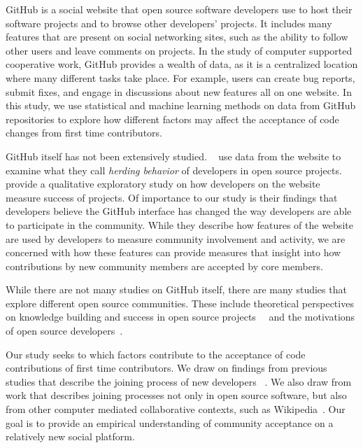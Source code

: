 \documentclass{iitthesis}
\begin{document}
\textpages     %


 \label{sec:github}

GitHub is a social website that open source software developers use to host
their software projects and to browse other developers' projects. It includes
many features that are present on social networking sites, such as the ability
to follow other users and leave comments on projects. In the study of computer
supported cooperative work, GitHub provides a wealth of data, as it is a
centralized location where many different tasks take place. For example, users
can create bug reports, submit fixes, and engage in discussions about new
features all on one website.  In this study, we use statistical and machine
learning methods on data from GitHub repositories to explore how different
factors may affect the acceptance of code changes from first time contributors.

 \label{sec:relatedwork}

GitHub itself has not been extensively studied. ~\cite{choi_herding_2013} use
data from the website to examine what they call \textit{herding behavior} of
developers in open source projects.  ~\cite{mcdonald_performance_2013} provide a
qualitative exploratory study on how developers on the website measure success
of projects. Of importance to our study is their findings that developers
believe the GitHub interface has changed the way developers are able to
participate in the community. While they describe how features of the website
are used by developers to measure community involvement and activity, we are
concerned with how these features can provide measures that insight into how
contributions by new community members are accepted by core members.

While there are not many studies on GitHub itself, there are many studies that
explore different open source communities. These include theoretical
perspectives on knowledge building and success in open source
projects~\cite{hemetsberger_learning_2006}~\cite{hemetsberger_collective_2009}
and the motivations of open source
developers~\cite{hertel_motivation_2003}\cite{lakhani_why_2003}.

Our study seeks to which factors contribute to the acceptance of code
contributions of first time contributors. We draw on findings from previous
studies that describe the joining process of new developers
~\cite{huang_mining_2005}\cite{von_krogh_community_2003}. We also draw from work
that describes joining processes not only in open source software, but also from
other computer mediated collaborative contexts, such as
Wikipedia~\cite{bryant_becoming_2005}. Our goal is to provide an empirical
understanding of community acceptance on a relatively new social platform.
\end{document}
